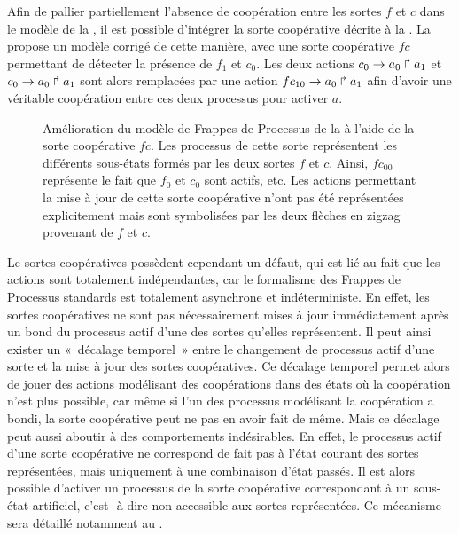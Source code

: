 \begin{example}
  Afin de pallier partiellement l'absence de coopération entre les sortes $f$ et $c$
  dans le modèle de la ,
  il est possible d'intégrer la sorte coopérative
  décrite à la .
  La  propose un modèle corrigé de cette manière,
  avec une sorte coopérative $fc$ permettant de détecter la présence de $f_1$ et $c_0$.
  Les deux actions $c_0\rightarrow a_0\Rsh a_1$ et $c_0\rightarrow a_0\Rsh a_1$
  sont alors remplacées par une action $fc_{10}\rightarrow a_0\Rsh a_1$
  afin d'avoir une véritable coopération entre ces deux processus pour activer $a$.
  
  \begin{figure}[p]
  \begin{center}
  \caption{%
    Amélioration du modèle de Frappes de Processus de la 
    à l'aide de la sorte coopérative $fc$.
    Les processus de cette sorte représentent les différents sous-états formés par les
    deux sortes $f$ et $c$.
    Ainsi, $fc_{00}$ représente le fait que $f_0$ et $c_0$ sont actifs, etc.
    Les actions permettant la mise à jour de cette sorte coopérative n'ont pas
    été représentées explicitement mais sont symbolisées par les deux flèches
    en zigzag provenant de $f$ et $c$.
  }
  \end{center}
  \end{figure}
\end{example}

\myskip

Le sortes coopératives possèdent cependant un défaut, qui est lié au fait que les actions
sont totalement indépendantes, car
le formalisme des Frappes de Processus standards est totalement asynchrone et indéterministe.
En effet, les sortes coopératives ne sont pas nécessairement mises à jour immédiatement
après un bond du processus actif d'une des sortes qu'elles représentent.
Il peut ainsi exister un «~décalage temporel~» entre le changement de processus actif
d'une sorte et la mise à jour des sortes coopératives.
Ce décalage temporel permet alors de jouer des actions modélisant des coopérations dans des états
où la coopération n'est plus possible,
car même si l'un des processus modélisant la coopération a bondi,
la sorte coopérative peut ne pas en avoir fait de même.
Mais ce décalage peut aussi aboutir à des comportements indésirables.
En effet, le processus actif d'une sorte coopérative ne correspond de fait pas à l'état courant
des sortes représentées, mais uniquement à une combinaison d'état passés.
Il est alors possible d'activer un processus de la sorte coopérative correspondant à
un sous-état artificiel,
c'est -à-dire non accessible aux sortes représentées.
Ce mécanisme sera détaillé notamment au .

